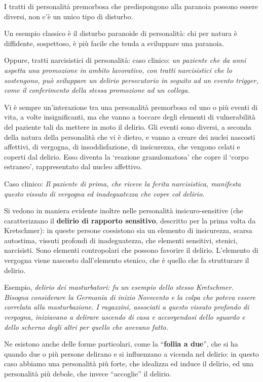 \documentclass[]{article}
\begin{document}
I tratti di personalità premorbosa che predispongono alla paranoia
possono essere diversi, non c'è un unico tipo di disturbo.

Un esempio classico è il disturbo paranoide di personalità: chi per
natura è diffidente, sospettoso, è più facile che tenda a sviluppare una
paranoia.

Oppure, tratti narcisistici di personalità: caso clinico: \emph{un
paziente che da anni aspetta una promozione in ambito lavorativo, con
tratti narcisistici che lo sostengono, può sviluppare un delirio
persecutorio in seguito ad un evento trigger, come il conferimento della
stessa promozione ad un collega. }

Vi è sempre un'interazione tra una personalità premorbosa ed uno o più
eventi di vita, a volte insignificanti, ma che vanno a toccare degli
elementi di vulnerabilità del paziente tali da mettere in moto il
delirio. Gli eventi sono diversi, a seconda della natura della
personalità che vi è dietro, e vanno a creare dei nuclei nascosti
affettivi, di vergogna, di insoddisfazione, di insicurezza, che vengono
celati e coperti dal delirio. Esso diventa la `reazione granulomatosa'
che copre il `corpo estraneo', rappresentato dal nucleo affettivo.

Caso clinico: \emph{Il paziente di prima, che riceve la ferita
narcisistica, manifesta questo vissuto di vergogna ed inadeguatezza che
copre col delirio.}

Si vedono in maniera evidente inoltre nelle personalità
insicuro-sensitive (che caratterizzano il \textbf{delirio di rapporto
sensitivo}, descritto per la prima volta da Kretschmer): in queste
persone coesistono sia un elemento di insicurezza, scarsa autostima,
vissuti profondi di inadeguatezza, che elementi sensitivi, stenici,
narcisisti. Sono elementi contropolari che possono favorire il delirio.
L'elemento di vergogna viene nascosto dall'elemento stenico, che è
quello che fa strutturare il delirio.

Esempio, \emph{delirio dei masturbatori: fu un esempio dello stesso
Kretschmer. Bisogna considerare la Germania di inizio Novecento e la
colpa che poteva essere correlata alla masturbazione. I ragazzini,
associati a questo vissuto profondo di vergogna, iniziavano a delirare
uscendo di casa e accorgendosi dello sguardo e dello scherno degli altri
per quello che avevano fatto.}

Ne esistono anche delle forme particolari, come la ``\textbf{follia a
due}'', che si ha quando due o più persone delirano e si influenzano a
vicenda nel delirio: in questo caso abbiamo una personalità più forte,
che idealizza ed induce il delirio, ed una personalità più debole, che
invece ``accoglie'' il delirio.
\end{document}
